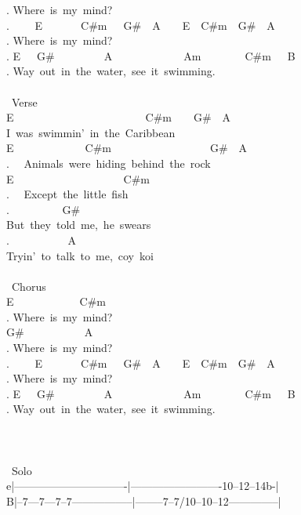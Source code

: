 {. Where\ is\ my\ mind?\\
. \ \ \ \ E\ \ \ \ \ \ \ C\#m\ \ \ G\#\ \ A\ \ \ \ E\ \ C\#m\ \ G\#\ \ A\\
. Where\ is\ my\ mind?\\
. E\ \ \ G\#\ \ \ \ \ \ \ \ \ A\ \ \ \ \ \ \ \ \ \ \ \ \ Am\ \ \ \ \ \ \ \ C\#m\ \ \ B\\
. Way\ out\ in\ the\ water,\ see\ it\ swimming.\\
\\
\lbrack\ Verse\rbrack\\
E\ \ \ \ \ \ \ \ \ \ \ \ \ \ \ \ \ \ \ \ \ \ \ \ C\#m\ \ \ \ G\#\ \ A\\
I\ was\ swimmin'\ in\ the\ Caribbean\\
E\ \ \ \ \ \ \ \ \ \ \ \ \ C\#m\ \ \ \ \ \ \ \ \ \ \ \ \ \ \ \ \ \ G\#\ \ A\\
. \ \ Animals\ were\ hiding\ behind\ the\ rock\\
E\ \ \ \ \ \ \ \ \ \ \ \ \ \ \ \ \ \ \ \ C\#m\\
. \ \ Except\ the\ little\ fish\\
. \ \ \ \ \ \ \ \ \ G\#\\
But\ they\ told\ me,\ he\ swears\\
. \ \ \ \ \ \ \ \ \ \ A\\
Tryin'\ to\ talk\ to\ me,\ coy\ koi\\
\\
\lbrack\ Chorus\rbrack\\
E\ \ \ \ \ \ \ \ \ \ \ \ C\#m\\
. Where\ is\ my\ mind?\\
G\#\ \ \ \ \ \ \ \ \ \ \ A\\
. Where\ is\ my\ mind?\\
. \ \ \ \ E\ \ \ \ \ \ \ C\#m\ \ \ G\#\ \ A\ \ \ \ E\ \ C\#m\ \ G\#\ \ A\\
. Where\ is\ my\ mind?\\
. E\ \ \ G\#\ \ \ \ \ \ \ \ \ A\ \ \ \ \ \ \ \ \ \ \ \ \ Am\ \ \ \ \ \ \ \ C\#m\ \ \ B\\
. Way\ out\ in\ the\ water,\ see\ it\ swimming.\\
\\
\\
\\
\lbrack\ Solo\rbrack\\
e|-------------------------------|-------------------------10--12--14b-|\\
B|--7---7---7--7-----------------|--------7--7/10--10--12--------------|\\
}
